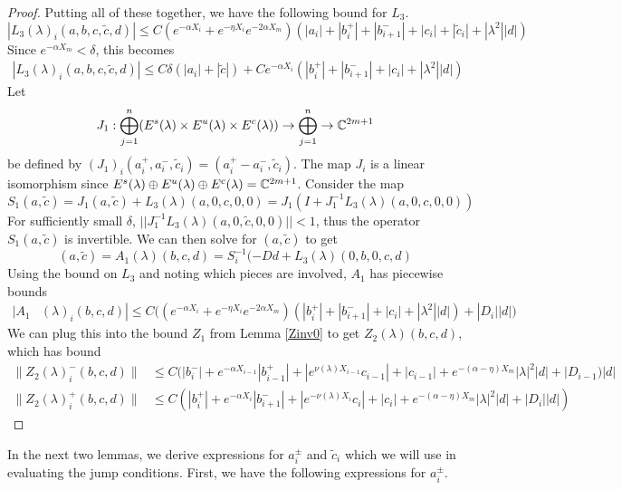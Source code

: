\documentclass[thesis.tex]{subfiles}
\begin{document}
\begin{lemma}
\begin{proof}
Putting all of these together, we have the following bound for $L_3$.
\begin{equation}\label{L3bound}
|L_3(\lambda)_i(a, b, c, \tilde{c}, d)| \leq C (e^{-\alpha X_i} + e^{-\eta X_i}e^{-2\alpha X_m}) \left( |a_i| + |b_i^+| + |b_{i+1}^-| + |c_i| + |\tilde{c}_i| + |\lambda^2| |d| \right)
\end{equation}
Since $e^{-\alpha X_m} < \delta$, this becomes
\begin{align*}
|L_3(\lambda)_i(a, b, c, \tilde{c}, d)| \leq C \delta ( |a_i| + |\tilde{c}| ) + C e^{-\alpha X_i} \left( |b_i^+| + |b_{i+1}^-| + |c_i| + |\lambda^2| |d| \right)
\end{align*}
Let 
\[
J_1: \bigoplus_{j=1}^n (E^s(\lambda) \times E^u(
\lambda) \times E^c(\lambda) ) \rightarrow \bigoplus_{j=1}^n \rightarrow \mathbb{C}^{2m+1}
\]
be defined by $(J_1)_i(a_i^+, a_i^-, \tilde{c}_i) = (a_i^+ - a_i^-, \tilde{c}_i)$. The map $J_i$ is a linear isomorphism since $E^s(\lambda) \oplus E^u(\lambda) \oplus E^c(\lambda) = \mathbb{C}^{2m+1}$. Consider the map
\[
S_1(a, \tilde{c}) = J_1 (a, \tilde{c}) + L_3(\lambda)(a, 0, c, 0, 0) = J_1( I + J_1^{-1} L_3(\lambda)(a, 0, c, 0, 0))
\]
For sufficiently small $\delta$, $||J_1^{-1} L_3(\lambda)(a, 0, \tilde{c}, 0, 0)|| < 1$, thus the operator $S_1(a, \tilde{c})$ is invertible. We can then solve for $(a, \tilde{c})$ to get
\[
(a, \tilde{c}) = A_1(\lambda)(b, c, d) = S_i^{-1}(-D d + L_3(\lambda)(0, b, 0, c, d)
\]
Using the bound on $L_3$ and noting which pieces are involved, $A_1$ has piecewise bounds
\begin{align*}
|A_1&(\lambda)_i(b, c, d)|
\leq C \Big( (e^{-\alpha X_i} + e^{-\eta X_i}e^{-2\alpha X_m}) (|b_i^+| + |b_{i+1}^-| + |c_i| + |\lambda^2||d|) + |D_i||d| \Big)
\end{align*} 
We can plug this into the bound $Z_1$ from Lemma \ref{Zinv0} to get $Z_2(\lambda)(b,c,d)$, which has bound
\begin{align*}
\| Z_2(\lambda)_i^-(b,c,d) \| &\leq C(|b_i^-| + e^{-\alpha X_{i-1}}|b_{i-1}^+| + |e^{\nu(\lambda)X_{i-1}}c_{i-1}| + |c_{i-1}| + e^{-(\alpha - \eta) X_m}|\lambda|^2|d| + |D_{i-1})|d| \\
\| Z_2(\lambda)_i^+(b,c,d) \| &\leq C(|b_i^+| + e^{-\alpha X_i}|b_{i+1}^-| + |e^{-\nu(\lambda)X_i} c_i| + |c_i| + e^{-(\alpha - \eta) X_m}|\lambda|^2|d| + |D_i||d|)
\end{align*}
\end{proof}
\end{lemma}

In the next two lemmas, we derive expressions for $a_i^\pm$ and $\tilde{c}_i$ which we will use in evaluating the jump conditions. First, we have the following expressions for $a_i^\pm$.
\end{document}
